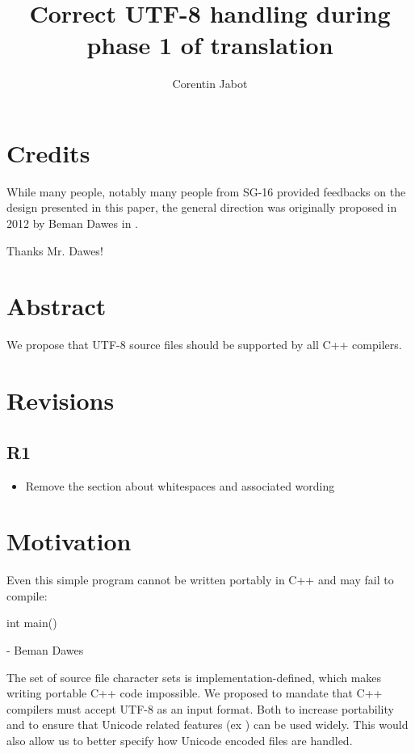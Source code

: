 \documentclass{wg21}
\title{Correct UTF-8 handling during phase 1 of translation}
\author{Corentin Jabot}{corentin.jabot@gmail.com}
\begin{document}
\maketitle


\section{Credits}

While many people, notably many people from SG-16 provided feedbacks on the design presented in this paper,
the general direction was originally proposed in 2012 by Beman Dawes in .

Thanks Mr. Dawes!

\section{Abstract}

We propose that UTF-8 source files should be supported by all C++ compilers.

\section{Revisions}

\subsection{R1}
\begin{itemize}
    \item Remove the section about whitespaces and associated wording
\end{itemize}

\section{Motivation}

\begin{quoteblock}
    Even this simple program cannot be written portably in C++ and may fail to compile:
\begin{codeblock}
    int main() {}
\end{codeblock}
 - Beman Dawes
\end{quoteblock}

The set of source file character sets is implementation-defined, which makes writing portable C++ code impossible.
We proposed to mandate that C++ compilers must accept UTF-8 as an input format. Both to increase portability and
to ensure that Unicode related features (ex ) can be used widely.
This would also allow us to better specify how Unicode encoded files are handled.
\end{document}
